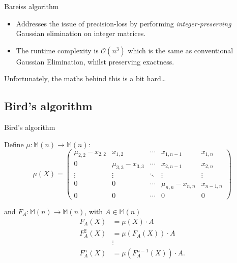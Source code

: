 \documentclass{beamer}
\begin{document}
\begin{frame}{Bareiss algorithm}

    \begin{itemize}

        \item Addresses the issue of precision-loss by performing \emph{integer-preserving}
            Gaussian elimination on integer matrices.

        \item The runtime complexity is $\mathcal{O}(n^3)$ which is the same as conventional
            Gaussian Elimination, whilst preserving exactness.

    \end{itemize}

    \pause{}

    Unfortunately, the maths behind this is a bit hard\dots

\end{frame}

\subsection{Bird's algorithm}

\begin{frame}{Bird's algorithm}

    Define $\mu : \mathbb{M}(n) \to \mathbb{M}(n)$:
    \[
        \mu(X) =
        \begin{pmatrix}{}
            \mu_{2,2} - x_{2,2} & x_{1,2}             & \cdots & x_{1,n-1}           & x_{1,n} \\
            0                   & \mu_{3,3} - x_{3,3} & \cdots & x_{2,n-1}           & x_{2,n} \\
            \vdots              & \vdots              & \ddots & \vdots              & \vdots \\
            0                   & 0                   & \cdots & \mu_{n,n} - x_{n,n} & x_{n-1,n} \\
            0                   & 0                   & \cdots & 0                   & 0
        \end{pmatrix}
    \]

    \pause{}

    and $F_A : \mathbb{M}(n) \to \mathbb{M}(n)$,
    with $A \in \mathbb{M}(n)$
    \begin{align*}{}
        F_A(X)    & = \mu(X)\cdot A \\
        F_A^2(X)  & = \mu(F_A(X)) \cdot A \\
                  & \vdots \\
        F_A^n(X)  & = \mu(F_A^{n-1}(X)) \cdot A. \\
    \end{align*}

\end{frame}
\end{document}
